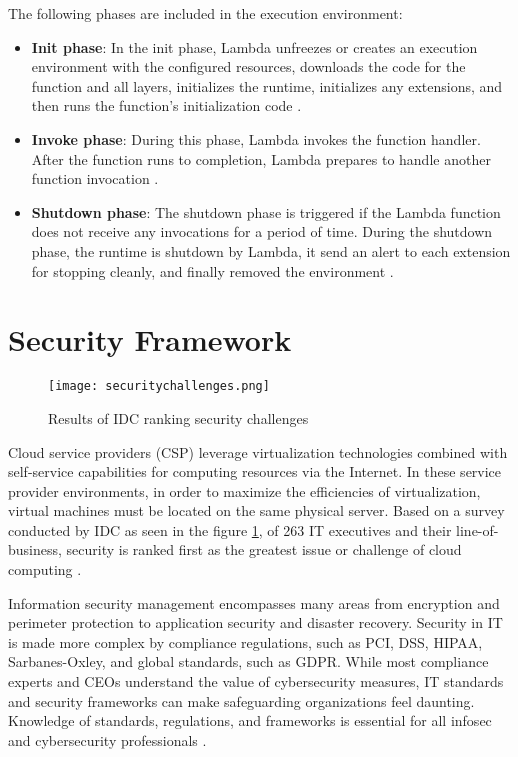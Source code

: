 {\par The following phases are included in the execution
environment:
\begin{itemize}
    \item \textbf{Init phase}: In the init phase, Lambda unfreezes or creates an execution environment with the configured
    resources, downloads the code for the function and all layers, initializes the runtime, initializes any
    extensions, and then runs the function’s initialization code \cite{27}.
\end{itemize}
\begin{itemize}
    \item \textbf{Invoke phase}: During this phase, Lambda invokes the function handler. After the function runs to
    completion, Lambda prepares to handle another function invocation \cite{27}.
\end{itemize}
\begin{itemize}
    \item \textbf{Shutdown phase}: The shutdown phase is triggered if the Lambda function does not receive any invocations
    for a period of time.
    During the shutdown  phase, the runtime is shutdown by Lambda, it send an alert to each extension for stopping cleanly, and finally removed the environment \cite{27}.
\end{itemize}


\section{Security Framework}

\begin{figure}
    \centering
    \texttt{[image: securitychallenges.png]}
    \caption{Results of IDC ranking security challenges}
    \label{fig:securitychallenges}
\end{figure}

\par Cloud service providers (CSP) leverage
virtualization technologies combined with self-service capabilities for computing resources via the Internet.
In these service provider environments, in order to maximize the efficiencies of virtualization, virtual machines must be located on the same physical server.
Based on a survey conducted by IDC as seen in the figure \ref{fig:securitychallenges}, of 263 IT executives and their line-of-business, security is ranked first as the greatest issue or challenge of cloud computing \cite{79}.

\par Information security management encompasses many areas from encryption and perimeter protection to application security and disaster recovery.
Security in IT is made more complex by compliance regulations, such as PCI, DSS, HIPAA, Sarbanes-Oxley, and global standards, such as GDPR. While most compliance experts and CEOs understand the value of cybersecurity measures, IT standards and security frameworks can make safeguarding organizations feel daunting.
Knowledge of standards, regulations, and frameworks is essential for all infosec and cybersecurity professionals \cite{80}.

}
